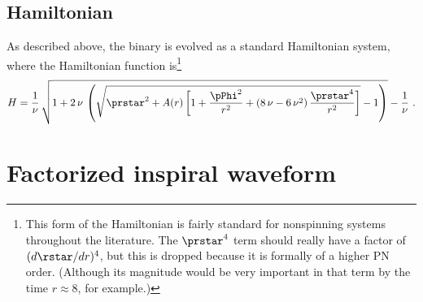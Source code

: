 \documentclass[twoside, aps, prd, letterpaper, noshowpacs, %
amsmath, amssymb, amsfonts, nofootinbib, floatfix, notitlepage]%
{revtex4-1}
\begin{document}
\subsection{Hamiltonian}
As described above, the binary is evolved as a standard Hamiltonian
system, where the Hamiltonian function is\footnote{This form of the
  Hamiltonian is fairly standard for nonspinning systems throughout
  the literature.  The $\prstar^{4}$ term should really have a factor
  of $(d\rstar/dr)^{4}$, but this is dropped because it is formally of
  a higher PN order.  (Although its magnitude would be very important
  in that term by the time $r \approx 8$, for example.)}
\begin{equation}
  \label{eq:Hamiltonian}
  H = \frac{1}{\nu}\, \sqrt{1 + 2\, \nu\, \left(
      \sqrt{\prstar^{2} + A(r) \left[ 1 + \frac{\pPhi^{2}}{r^{2}} +
          (8\, \nu - 6\, \nu^{2})\, \frac{\prstar^{4}} {r^{2}}
        \right]} - 1 \right)} - \frac{1}{\nu}~.
\end{equation}

\section{Factorized inspiral waveform}
\label{sec:InspiralWaveform}
\end{document}
